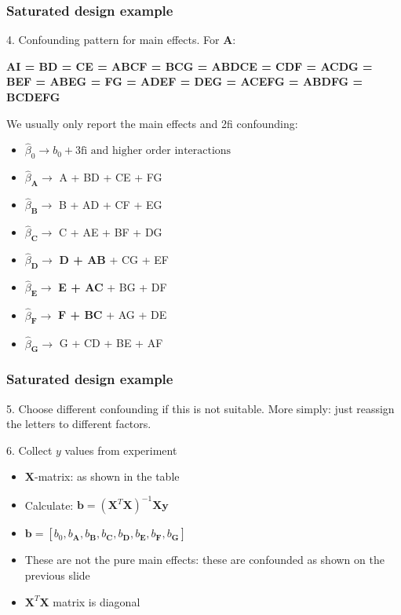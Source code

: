 \begin{frame}\frametitle{Saturated design example}

	4. Confounding pattern for main effects. For \textbf{A}:

	\textbf{AI = BD = CE = ABCF = BCG = ABDCE = CDF = ACDG = BEF = ABEG = FG = ADEF = DEG = ACEFG = ABDFG = BCDEFG}

	We usually only report the main effects and 2fi confounding:
	\begin{itemize}
		\item	$\widehat{\beta}_0 \rightarrow b_0 + \text{3fi and higher order interactions}$
		\item	$\widehat{\beta}_{\mathbf{A}} \rightarrow$ A + BD + CE + FG
		\item	$\widehat{\beta}_{\mathbf{B}} \rightarrow$ B + AD + CF + EG
		\item	$\widehat{\beta}_{\mathbf{C}} \rightarrow$ C + AE + BF + DG
		\item	$\widehat{\beta}_{\mathbf{D}} \rightarrow$ \textbf{D + AB} + CG + EF
		\item	$\widehat{\beta}_{\mathbf{E}} \rightarrow$ \textbf{E + AC} + BG + DF
		\item	$\widehat{\beta}_{\mathbf{F}} \rightarrow$ \textbf{F + BC} + AG + DE
		\item	$\widehat{\beta}_{\mathbf{G}} \rightarrow$ G + CD + BE + AF
	\end{itemize}
\end{frame}

\begin{frame}\frametitle{Saturated design example}

	5. Choose different confounding if this is not suitable. More simply: just reassign the letters to different factors.

	\vspace{12pt}
	6. Collect $y$ values from experiment
	\begin{itemize}
		\item	$\mathbf{X}$-matrix: as shown in the table
		\item	Calculate: $\mathbf{b} = \left(\mathbf{X}^T\mathbf{X}\right)^{-1}\mathbf{X}\mathbf{y}$
		\item	$\mathbf{b} = [b_0, b_\mathbf{A}, b_\mathbf{B}, b_\mathbf{C}, b_\mathbf{D}, b_\mathbf{E}, b_\mathbf{F}, b_\mathbf{G}]$
		\item	These are not the pure main effects: these are confounded as shown on the previous slide
		\item	$\mathbf{X}^T\mathbf{X}$ matrix is diagonal
	\end{itemize}
\end{frame}

